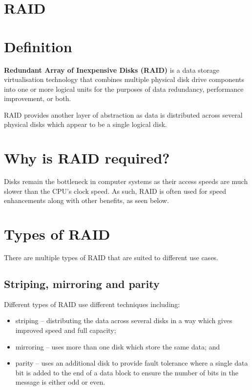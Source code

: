 \documentclass[a4paper]{systems-software}
\begin{document}
\newpage

\section{RAID}

\section*{Definition}

\textbf{Redundant Array of Inexpensive Disks (RAID)} is a data storage virtualisation technology that combines multiple physical disk drive components into one or more logical units for the purposes of data redundancy, performance improvement, or both.

RAID provides another layer of abstraction as data is distributed across several physical disks which appear to be a single logical disk.


\section*{Why is RAID required?}

Disks remain the bottleneck in computer systems as their access speeds are much slower than the CPU's clock speed. As such, RAID is often used for speed enhancements along with other benefits, as seen below.


\section*{Types of RAID}

There are multiple types of RAID that are suited to different use cases.


\subsection*{Striping, mirroring and parity}

Different types of RAID use different techniques including:
\begin{itemize}
	\item striping -- distributing the data across several disks in a way which gives improved speed and full capacity;
	\item mirroring -- uses more than one disk which store the same data; and
	\item parity -- uses an additional disk to provide fault tolerance where a single data bit is added to the end of a data block to ensure the number of bits in the message is either odd or even.
\end{itemize}
\end{document}
